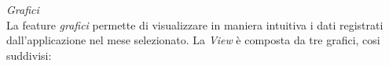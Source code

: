 \documentclass{article}
\begin{document}
    \begin{center}
        \begin{figure}[H]
            \centering
        \end{figure}
    \end{center}
    \textit{Grafici} \vspace*{7pt}\\
    La feature \textit{grafici} permette di visualizzare in maniera intuitiva i dati registrati dall'applicazione nel mese selezionato. La \textit{View} è composta da tre grafici, cosi suddivisi:
\end{document}
